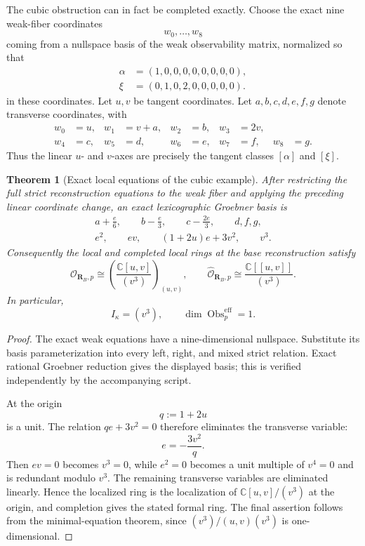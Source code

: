 \documentclass[11pt]{amsart}
\newtheorem{theorem}{Theorem}[section]
\newcommand{\Obs}{\operatorname{Obs}}
\newcommand{\cO}{\mathcal O}
\newcommand{\C}{\mathbb C}
\begin{document}
The cubic obstruction can in fact be completed exactly.  Choose the exact nine weak-fiber coordinates
\[
w_0,\ldots,w_8
\]
coming from a nullspace basis of the weak observability matrix, normalized so that
\[
\begin{aligned}
\alpha&=(1,0,0,0,0,0,0,0,0),\\
\xi&=(0,1,0,2,0,0,0,0,0).
\end{aligned}
\]
in these coordinates.  Let $u,v$ be tangent coordinates.  Let
$a,b,c,d,e,f,g$ denote transverse coordinates, with
\[
\begin{aligned}
w_0&=u, & w_1&=v+a, & w_2&=b, & w_3&=2v,\\
w_4&=c, & w_5&=d, & w_6&=e, & w_7&=f, & w_8&=g.
\end{aligned}
\]
Thus the linear $u$- and $v$-axes are precisely the tangent classes $[\alpha]$ and $[\xi]$.

\begin{theorem}[Exact local equations of the cubic example]\label{thm:cubic-complete-germ}
After restricting the full strict reconstruction equations to the weak fiber and applying the preceding linear coordinate change, an exact lexicographic Groebner basis is
\[
\boxed{
\begin{gathered}
a+\frac e6,
\qquad
b-\frac e3,
\qquad
c-\frac{2e}{3},
\qquad
d,
f,
g,\\
e^2,
\qquad
ev,
\qquad
(1+2u)e+3v^2,
\qquad
v^3.
\end{gathered}}
\]
Consequently the local and completed local rings at the base reconstruction satisfy
\[
\cO_{\mathbf R_B,p}
\cong
\left(\frac{\C[u,v]}{(v^3)}\right)_{(u,v)},
\qquad
\boxed{
\widehat{\cO}_{\mathbf R_B,p}
\cong
\frac{\C[[u,v]]}{(v^3)}.
}
\]
In particular,
\[
I_\kappa=(v^3),
\qquad
\dim\Obs^{\mathrm{eff}}_p=1.
\]
\end{theorem}

\begin{proof}
The exact weak equations have a nine-dimensional nullspace.  Substitute its basis parameterization into every left, right, and mixed strict relation.  Exact rational Groebner reduction gives the displayed basis; this is verified independently by the accompanying script.

At the origin
\[
q:=1+2u
\]
is a unit.  The relation $qe+3v^2=0$ therefore eliminates the transverse variable:
\[
e=-\frac{3v^2}{q}.
\]
Then $ev=0$ becomes $v^3=0$, while $e^2=0$ becomes a unit multiple of $v^4=0$ and is redundant modulo $v^3$.  The remaining transverse variables are eliminated linearly.  Hence the localized ring is the localization of $\C[u,v]/(v^3)$ at the origin, and completion gives the stated formal ring.  The final assertion follows from the minimal-equation theorem, since $(v^3)/(u,v)(v^3)$ is one-dimensional.
\end{proof}
\end{document}
